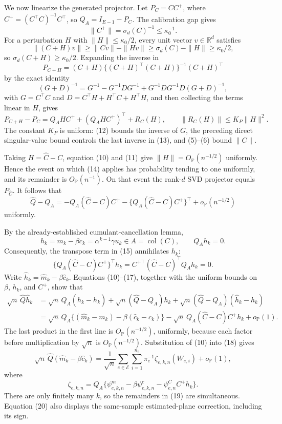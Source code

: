 We now linearize the generated projector.  Let \(P_C=CC^+\), where
\(C^+=(C^\top C)^{-1}C^\top\), so \(Q_A=I_{E-1}-P_C\).  The calibration gap gives
\[
 \|C^+\|=\sigma_d(C)^{-1}\leq\kappa_0^{-1}. \tag{12}
\]
For a perturbation \(H\) with \(\|H\|\leq\kappa_0/2\), every unit vector \(v\in\mathbb R^d\) satisfies
\[
 \|(C+H)v\|\geq\|Cv\|-\|Hv\|
 \geq\sigma_d(C)-\|H\|\geq\kappa_0/2,
\]
so \(\sigma_d(C+H)\geq\kappa_0/2\).  Expanding the inverse in
\[
 P_{C+H}=(C+H)\{(C+H)^\top(C+H)\}^{-1}(C+H)^\top
\]
by the exact identity
\[
 (G+D)^{-1}=G^{-1}-G^{-1}DG^{-1}
 +G^{-1}DG^{-1}D(G+D)^{-1}, \tag{13}
\]
with \(G=C^\top C\) and \(D=C^\top H+H^\top C+H^\top H\), and then collecting the terms linear in \(H\), gives
\[
 P_{C+H}-P_C
 =Q_AHC^+ +(Q_AHC^+)^\top+R_C(H),
 \qquad \|R_C(H)\|\leq K_P\|H\|^2. \tag{14}
\]
The constant \(K_P\) is uniform: (12) bounds the inverse of \(G\), the preceding direct singular-value bound controls the last inverse in (13), and (5)--(6) bound \(\|C\|\).

Taking \(H=\widehat C-C\), equation (10) and (11) give
\(\|H\|=O_{\mathbb P}(n^{-1/2})\) uniformly.  Hence the event on which (14) applies has probability tending to one uniformly, and its remainder is \(O_{\mathbb P}(n^{-1})\).  On that event the rank-\(d\) SVD projector equals \(P_{\widehat C}\).  It follows that
\[
 \widehat Q-Q_A
 =-Q_A(\widehat C-C)C^+
  -\{Q_A(\widehat C-C)C^+\}^\top
  +o_{\mathbb P}(n^{-1/2}) \tag{15}
\]
uniformly.

By the already-established cumulant-cancellation lemma,
\[
 h_k=m_k-\beta c_k=\alpha^{k-1}\gamma u_k\in A=\operatorname{col}(C),
 \qquad Q_Ah_k=0. \tag{16}
\]
Consequently, the transpose term in (15) annihilates \(h_k\):
\[
 \{Q_A(\widehat C-C)C^+\}^\top h_k
 =C^{+\top}(\widehat C-C)^\top Q_Ah_k=0. \tag{17}
\]
Write \(\widehat h_k=\widehat m_k-\beta\widehat c_k\).  Equations (10)--(17), together with the uniform bounds on \(\beta\), \(h_k\), and \(C^+\), show that
\[
 \begin{aligned}
 \sqrt n\,\widehat Q\widehat h_k
 &=\sqrt n\,Q_A(\widehat h_k-h_k)
   +\sqrt n(\widehat Q-Q_A)h_k
   +\sqrt n(\widehat Q-Q_A)(\widehat h_k-h_k)\\
 &=\sqrt n\,Q_A\{(\widehat m_k-m_k)
       -\beta(\widehat c_k-c_k)\}
   -\sqrt n\,Q_A(\widehat C-C)C^+h_k+o_{\mathbb P}(1).
 \end{aligned} \tag{18}
\]
The last product in the first line is \(O_{\mathbb P}(n^{-1/2})\), uniformly, because each factor before multiplication by \(\sqrt n\) is \(O_{\mathbb P}(n^{-1/2})\).  Substitution of (10) into (18) gives
\[
 \sqrt n\,\widehat Q(\widehat m_k-\beta\widehat c_k)
 =\frac1{\sqrt n}\sum_{e\in\mathcal E}\sum_{i=1}^{n_e}
   \pi_e^{-1}\zeta_{e,k,n}(W_{e,i})+o_{\mathbb P}(1), \tag{19}
\]
where
\[
 \zeta_{e,k,n}
 =Q_A\{\psi^m_{e,k,n}-\beta\psi^c_{e,k,n}
          -\psi^C_{e,n}C^+h_k\}. \tag{20}
\]
There are only finitely many \(k\), so the remainders in (19) are simultaneous.  Equation (20) also displays the same-sample estimated-plane correction, including its sign.

